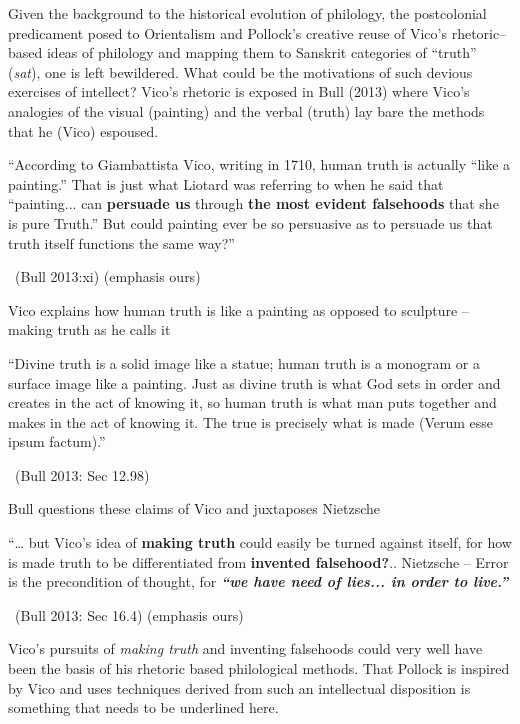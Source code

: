 Given the background to the historical evolution of philology, the postcolonial predicament posed to Orientalism and Pollock’s creative reuse of Vico’s rhetoric–based ideas of philology and mapping them to Sanskrit categories of “truth” (\textit{sat}), one is left bewildered. What could be the motivations of such devious exercises of intellect? Vico’s rhetoric is exposed in Bull (2013) where Vico’s analogies of the visual (painting) and the verbal (truth) lay bare the methods that he (Vico) espoused.

\begin{myquote}
“According to Giambattista Vico, writing in 1710, human truth is actually “like a painting.” That is just what Liotard was referring to when he said that “painting... can \textbf{persuade us} through \textbf{the most evident falsehoods} that she is pure Truth.” But could painting ever be so persuasive as to persuade us that truth itself functions the same way?”

~\hfill (Bull 2013:xi) (emphasis ours)
\end{myquote}

Vico explains how human truth is like a painting as opposed to sculpture – making truth as he calls it

\begin{myquote}
“Divine truth is a solid image like a statue; human truth is a monogram or a surface image like a painting. Just as divine truth is what God sets in order and creates in the act of knowing it, so human truth is what man puts together and makes in the act of knowing it. The true is precisely what is made (Verum esse ipsum factum).”

~\hfill (Bull 2013: Sec 12.98)
\end{myquote}

Bull questions these claims of Vico and juxtaposes Nietzsche

\begin{myquote}
“… but Vico’s idea of \textbf{making truth} could easily be turned against itself, for how is made truth to be differentiated from \textbf{invented falsehood?}.. Nietzsche – Error is the precondition of thought, for \textbf{\textit{“we have need of lies... in order to live.”}}

~\hfill (Bull 2013: Sec 16.4) (emphasis ours)
\end{myquote}

Vico’s pursuits of \textit{making truth} and inventing falsehoods could very well have been the basis of his rhetoric based philological methods. That Pollock is inspired by Vico and uses techniques derived from such an intellectual disposition is something that needs to be underlined here.

